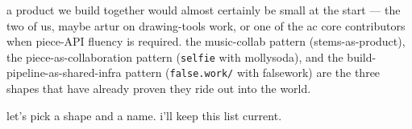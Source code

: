 \documentclass[11pt,letterpaper]{article}
\begin{document}
a product we build together would almost certainly be small at the start
--- the two of us, maybe artur on drawing-tools work, or one of the ac
core contributors when piece-API fluency is required. the music-collab
pattern (stems-as-product), the piece-as-collaboration pattern
(\texttt{selfie} with mollysoda), and the build-pipeline-as-shared-infra
pattern (\texttt{false.work/} with falsework) are the three shapes that
have already proven they ride out into the world.

let's pick a shape and a name. i'll keep this list current.

\end{document}
